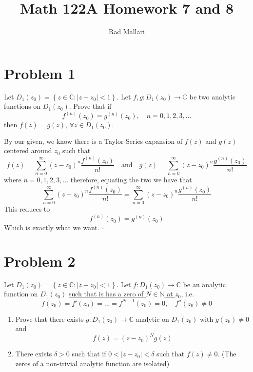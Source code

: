 \documentclass[11pt]{article}
\title{Math 122A Homework 7 and 8}
\author{Rad Mallari}
\newcommand{\N}{\mathbb{N}}
\newcommand{\C}{\mathbb{C}}
\newcommand{\set}[1]{\left\{ #1\right\}}
\newenvironment{proof}{\noindent{\bf Proof.}}{\hfill $\square$\medskip}
\begin{document}
\maketitle


\section{Problem 1}
Let $D_{1}(z_{0})=\set{z\in\C:|z-z_{0}|<1}$. Let $f,g:D_{1}(z_{0})\to\C$ be two analytic functions on $D_{1}(z_{0})$. Prove that if
$$f^{(n)}(z_{0})=g^{(n)}(z_{0}),\quad n=0,1,2,3,...$$
then $f(z)=g(z)$, $\forall z\in D_{1}(z_{0})$.

\begin{proof}
    By our given, we know there is a Taylor Series expansion of $f(z)$ and $g(z)$ centered around $z_{0}$ such that
    $$f(z)=\sum_{n=0}^{\infty}(z-z_{0})^{n}\frac{f^{(n)}(z_{0})}{n!} \quad\text{and}\quad g(z)=\sum_{n=0}^{\infty}(z-z_{0})^{n}\frac{g^{(n)}(z_{0})}{n!}$$
    where $n=0,1,2,3,...$ therefore, equating the two we have that
    $$\sum_{n=0}^{\infty}(z-z_{0})^{n}\frac{f^{(n)}(z_{0})}{n!}=\sum_{n=0}^{\infty}(z-z_{0})^{n}\frac{g^{(n)}(z_{0})}{n!}$$
    This reduces to
    $$f^{(n)}(z_{0})=g^{(n)}(z_{0})$$
    Which is exactly what we want.
\end{proof}


\newpage
\section{Problem 2}
Let $D_{1}(z_{0})=\set{z\in\C:|z-z_{0}|<1}$. Let $f:D_{1}(z_{0})\to\C$ be an analytic function on $D_{1}(z_{0})$ \underline{such that is has a zero of $N\in\N$ at $z_{0}$}, i.e.
$$f(z_{0})=f'(z_{0})=...=f^{N-1}(z_{0})=0,\quad f^{n}(z_{0})\neq0$$
\begin{enumerate}[label=\textbf{(\roman*)}]
    \item Prove that there exists $g:D_{1}(z_{0})\to\C$ analytic on $D_{1}(z_{0})$ with $g(z_{0})\neq0$ and
          $$f(z)=(z-z_{0})^{N}g(z)$$
    \item There exists $\delta>0$ such that if $0<|z-z_{0}|<\delta$ such that $f(z)\neq0$. (The zeros of a non-trivial analytic function are isolated)
\end{enumerate}
\end{document}
